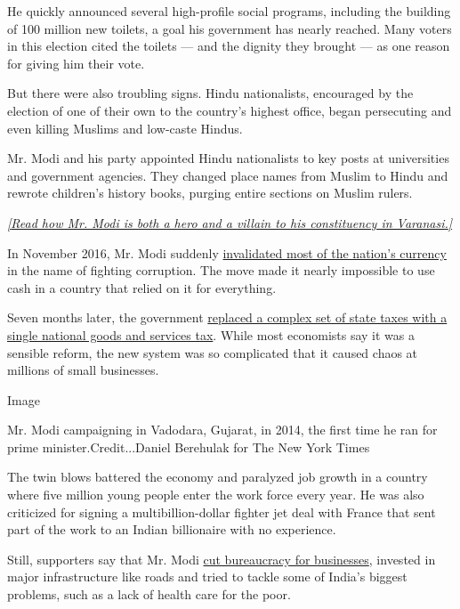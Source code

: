 He quickly announced several high-profile social programs, including the
building of 100 million new toilets, a goal his government has nearly
reached. Many voters in this election cited the toilets --- and the
dignity they brought --- as one reason for giving him their vote.

But there were also troubling signs. Hindu nationalists, encouraged by
the election of one of their own to the country's highest office, began
persecuting and even killing Muslims and low-caste Hindus.

Mr. Modi and his party appointed Hindu nationalists to key posts at
universities and government agencies. They changed place names from
Muslim to Hindu and rewrote children's history books, purging entire
sections on Muslim rulers.

\href{https://www.nytimes.com/2019/05/23/world/asia/modi-varanasi-india-elections.html}{\emph{{[}Read
how Mr. Modi is both a hero and a villain to his constituency in
Varanasi.{]}}}

In November 2016, Mr. Modi suddenly
\href{https://www.nytimes.com/2017/01/02/world/asia/modi-cash-ban-india.html}{invalidated
most of the nation's currency} in the name of fighting corruption. The
move made it nearly impossible to use cash in a country that relied on
it for everything.

Seven months later, the government
\href{https://www.nytimes.com/2017/06/30/world/asia/india-tax-narendra-modi.html}{replaced
a complex set of state taxes with a single national goods and services
tax}. While most economists say it was a sensible reform, the new system
was so complicated that it caused chaos at millions of small businesses.

Image

Mr. Modi campaigning in Vadodara, Gujarat, in 2014, the first time he
ran for prime minister.Credit...Daniel Berehulak for The New York Times

The twin blows battered the economy and paralyzed job growth in a
country where five million young people enter the work force every year.
He was also criticized for signing a multibillion-dollar fighter jet
deal with France that sent part of the work to an Indian billionaire
with no experience.

Still, supporters say that Mr. Modi
\href{https://www.nytimes.com/2019/05/14/business/india-modi-business-red-tape.html}{cut
bureaucracy for businesses}, invested in major infrastructure like roads
and tried to tackle some of India's biggest problems, such as a lack of
health care for the poor.

